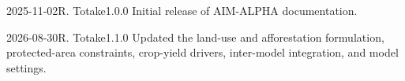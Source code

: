 \begin{changelogentry}{2025-11-02}{R. Totake}{1.0.0}
Initial release of AIM-ALPHA documentation.
\end{changelogentry}
\begin{changelogentry}{2026-08-30}{R. Totake}{1.1.0}
Updated the land-use and afforestation formulation, protected-area constraints, crop-yield drivers, inter-model integration, and model settings.
\end{changelogentry}

